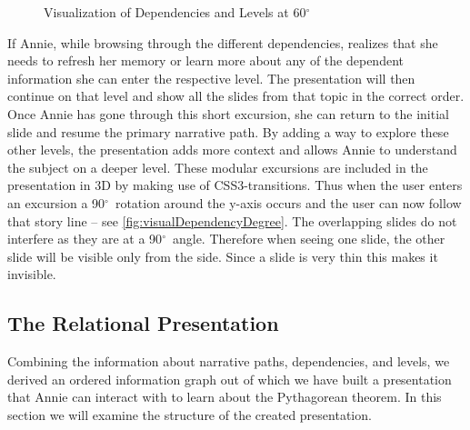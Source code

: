 \documentclass{llncs}
\def\degree{\ensuremath{^\circ}}
\begin{document}
\begin{figure}\vspace{-2em}
  \vspace{-.5em}
  \caption{Visualization of Dependencies and Levels at 60\degree}
  \label{fig:visualDependencyDegree}
\vspace{-1em}
\end{figure}
If Annie, while browsing through the different dependencies, realizes that she needs to
refresh her memory or learn more about any of the dependent information she can enter the
respective level. The presentation will then continue on that level and show all the
slides from that topic in the correct order. Once Annie has gone through this short
excursion, she can return to the initial slide and resume the primary narrative path. By
adding a way to explore these other levels, the presentation adds more context and allows
Annie to understand the subject on a deeper level. These modular excursions are included
in the presentation in 3D by making use of CSS3-transitions. Thus when the user enters an
excursion a 90\degree\ rotation around the y-axis occurs and the user can now follow that
story line -- see \autoref{fig:visualDependencyDegree}. The overlapping slides do not
interfere as they are at a 90\degree\ angle. Therefore when seeing one slide, the other
slide will be visible only from the side. Since a slide is very thin this makes it
invisible.

\subsection{The Relational Presentation}
\label{sec:RelationalPresentations}

Combining the information about narrative paths, dependencies, and levels, we derived an ordered information graph out of which we have built a presentation that Annie can interact with to learn about the Pythagorean theorem. In this section we will examine the structure of the created presentation.
\end{document}
